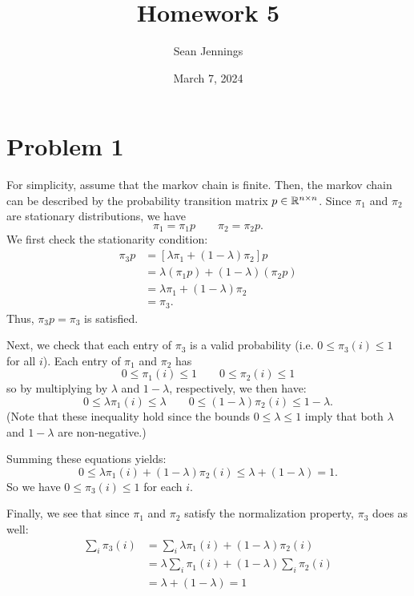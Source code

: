 \documentclass{homework}
\title{Homework 5}
\author{Sean Jennings}
\date{March 7, 2024}
\begin{document}
\maketitle

\section{Problem 1}
For simplicity, assume that the markov chain is finite. Then,
the markov chain can be described by the probability transition
matrix $p\in\mathbb{R}^{n\times n}$. Since $\pi_1$ and $\pi_2$ are 
stationary distributions, we have
\begin{equation*}
    \pi_1 = \pi_1 p \qquad \pi_2 = \pi_2 p.
\end{equation*}
We first check the stationarity condition:
\begin{align*}
    \pi_3 p &= [\lambda \pi_1 + (1 - \lambda) \pi_2] p \\
        &= \lambda ( \pi_1 p ) + (1 - \lambda) (\pi_2 p) \\
        &= \lambda \pi_1 + (1 - \lambda) \pi_2 \\
        &= \pi_3.
\end{align*}
Thus, $\pi_3 p = \pi_3$ is satisfied.

Next, we check that each entry of $\pi_3$ is a valid probability
(i.e. $0 \leq \pi_3(i) \leq 1$ for all $i$). Each entry of $\pi_1$
and $\pi_2$ has
\begin{equation*}
    0 \leq \pi_1(i) \leq 1 \qquad
    0 \leq \pi_2(i) \leq 1
\end{equation*}
so by multiplying by $\lambda$ and $1 - \lambda$, respectively, we then have:
\begin{equation*}
    0 \leq \lambda \pi_1(i) \leq \lambda \qquad
    0 \leq (1 - \lambda) \pi_2(i) \leq 1 - \lambda.
\end{equation*}
(Note that these inequality hold since the bounds $0 \leq \lambda \leq 1$
imply that both $\lambda$ and $1 - \lambda$ are non-negative.)

Summing these equations yields:
\begin{equation*}
    0 \leq \lambda \pi_1(i) + (1 - \lambda) \pi_2(i) \leq \lambda + (1 - \lambda) = 1.
\end{equation*}
So we have $0\leq \pi_3(i) \leq 1$ for each $i$.

Finally, we see that since $\pi_1$ and $\pi_2$ satisfy the normalization property,
$\pi_3$ does as well:
\begin{align*}
    \sum_i \pi_3(i) &= \sum_i \lambda \pi_1(i) + (1 - \lambda) \pi_2(i) \\
        &= \lambda \sum_i \pi_1(i) + (1 - \lambda) \sum_i \pi_2(i) \\
        &= \lambda + (1 - \lambda) = 1
\end{align*}
\end{document}
